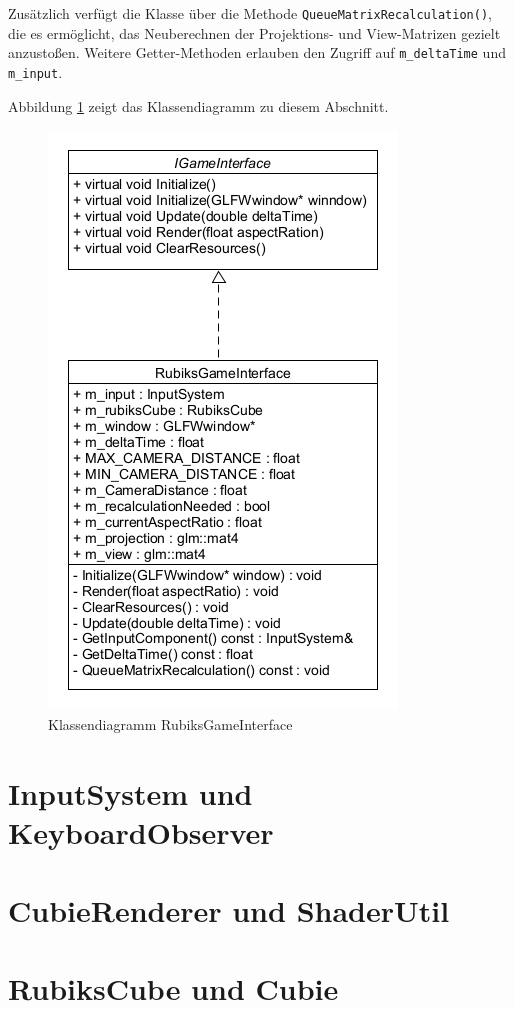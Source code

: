 Zusätzlich verfügt die Klasse über die Methode \texttt{QueueMatrixRecalculation()}, die es ermöglicht, das Neuberechnen der Projektions- und View-Matrizen gezielt anzustoßen.
Weitere Getter-Methoden erlauben den Zugriff auf \texttt{m\_deltaTime} und \texttt{m\_input}. 

Abbildung \ref{RubiksGameInterfaceDia} zeigt das Klassendiagramm zu diesem Abschnitt.

\begin{figure} [H]
	\centering
	\includegraphics[scale=0.6]{images/GameInterfaceClassDia.png}
	\caption{Klassendiagramm RubiksGameInterface}
	\label{RubiksGameInterfaceDia}
\end{figure}

\section{InputSystem und KeyboardObserver}

\section{CubieRenderer und ShaderUtil}

\section{RubiksCube und Cubie}

